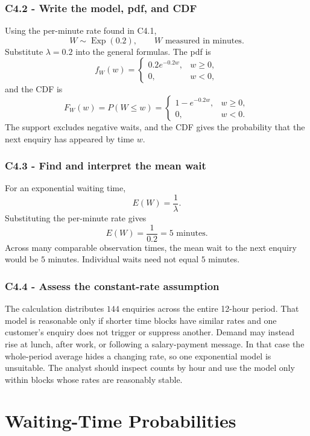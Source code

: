 \subsubsection*{C4.2 - Write the model, pdf, and CDF}\label{subsec:c4-rate-fintech-b}
Using the per-minute rate found in C4.1,
\[
 W\sim\operatorname{Exp}(0.2),\qquad W\text{ measured in minutes}.
\]
Substitute $\lambda=0.2$ into the general formulas.  The pdf is
\[
 f_W(w)=
 \begin{cases}
  0.2e^{-0.2w},&w\geq0,\\
  0,&w<0,
 \end{cases}
\]
and the CDF is
\[
 F_W(w)=P(W\leq w)=
 \begin{cases}
  1-e^{-0.2w},&w\geq0,\\
  0,&w<0.
 \end{cases}
\]
The support excludes negative waits, and the CDF gives the probability that
the next enquiry has appeared by time $w$.

\subsubsection*{C4.3 - Find and interpret the mean wait}\label{subsec:c4-rate-fintech-c}
For an exponential waiting time,
\[
 E(W)=\frac1\lambda.
\]
Substituting the per-minute rate gives
\[
 E(W)=\frac1{0.2}=5\text{ minutes}.
\]
Across many comparable observation times, the mean wait to the next enquiry
would be $5$ minutes.  Individual waits need not equal $5$ minutes.

\subsubsection*{C4.4 - Assess the constant-rate assumption}\label{subsec:c4-rate-fintech-d}
The calculation distributes $144$ enquiries across the entire 12-hour period.
That model is reasonable only if shorter time blocks have similar rates and
one customer's enquiry does not trigger or suppress another.  Demand may
instead rise at lunch, after work, or following a salary-payment message.  In
that case the whole-period average hides a changing rate, so one exponential
model is unsuitable.  The analyst should inspect counts by hour and use the
model only within blocks whose rates are reasonably stable.

\section{Waiting-Time Probabilities}\label{sec:c4-probabilities}

